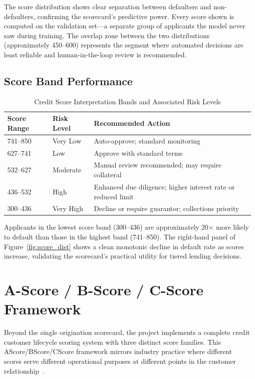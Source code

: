 The score distribution shows clear separation between defaulters and non-defaulters, confirming the scorecard's predictive power. Every score shown is computed on the validation set---a separate group of applicants the model never saw during training. The overlap zone between the two distributions (approximately 450--600) represents the segment where automated decisions are least reliable and human-in-the-loop review is recommended.

\subsection{Score Band Performance}

\begin{table}[H]
\centering
\caption{Credit Score Interpretation Bands and Associated Risk Levels}
\label{tab:score_bands}
\begin{tabular}{llp{7cm}}
\toprule
\textbf{Score Range} & \textbf{Risk Level} & \textbf{Recommended Action} \\
\midrule
741--850 & Very Low & Auto-approve; standard monitoring \\
627--741 & Low & Approve with standard terms \\
532--627 & Moderate & Manual review recommended; may require collateral \\
436--532 & High & Enhanced due diligence; higher interest rate or reduced limit \\
300--436 & Very High & Decline or require guarantor; collections priority \\
\bottomrule
\end{tabular}
\end{table}

Applicants in the lowest score band (300--436) are approximately 20$\times$ more likely to default than those in the highest band (741--850). The right-hand panel of Figure~\ref{fig:score_dist} shows a clean monotonic decline in default rate as scores increase, validating the scorecard's practical utility for tiered lending decisions.


\section{A-Score / B-Score / C-Score Framework}
\label{sec:abc_framework}

Beyond the single origination scorecard, the project implements a complete credit customer lifecycle scoring system with three distinct score families. This \ac{AScore}/\ac{BScore}/\ac{CScore} framework mirrors industry practice where different scores serve different operational purposes at different points in the customer relationship~\cite{siddiqi2012}.

